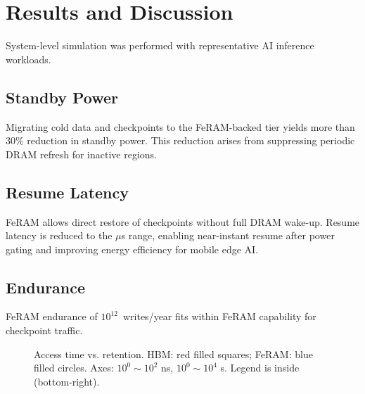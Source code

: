 \section{Results and Discussion}
System-level simulation was performed with representative AI inference workloads.

\subsection{Standby Power}
Migrating cold data and checkpoints to the FeRAM-backed tier yields more than 30\% reduction in standby power.
This reduction arises from suppressing periodic DRAM refresh for inactive regions.

\subsection{Resume Latency}
FeRAM allows direct restore of checkpoints without full DRAM wake-up.
Resume latency is reduced to the $\mu$s range, enabling near-instant resume after power gating and improving energy efficiency for mobile edge AI.

\subsection{Endurance}
FeRAM endurance of $10^{12}$~writes/year fits within FeRAM capability for checkpoint traffic.

\begin{figure}[t]
\centering
{}
\vspace{-2mm}
\caption{Access time vs. retention. HBM: red filled squares; FeRAM: blue filled circles.
Axes: $10^0\!\sim\!10^2$ ns, $10^0\!\sim\!10^4$ s. Legend is inside (bottom-right).}
\label{fig:retention}
\end{figure}

